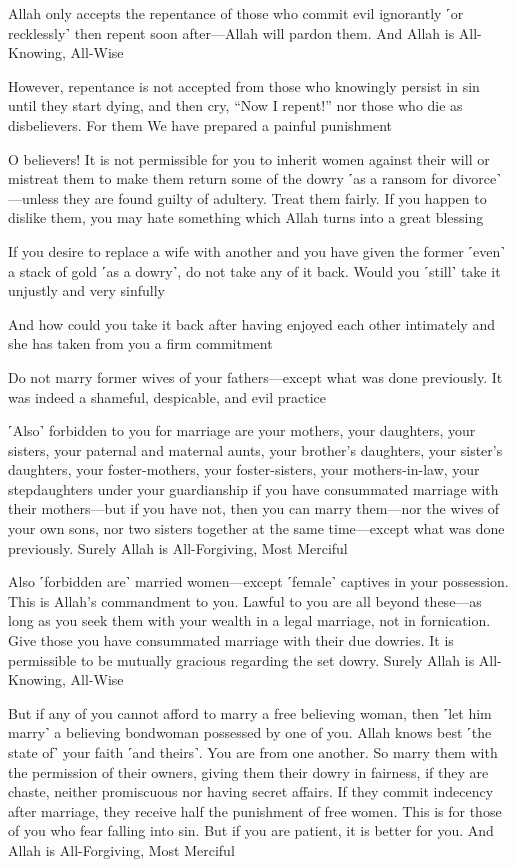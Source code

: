 Allah only accepts the repentance of those who commit evil ignorantly ˹or recklessly˺ then repent soon after—Allah will pardon them. And Allah is All-Knowing, All-Wise

However, repentance is not accepted from those who knowingly persist in sin until they start dying, and then cry, “Now I repent!” nor those who die as disbelievers. For them We have prepared a painful punishment

O believers! It is not permissible for you to inherit women against their will or mistreat them to make them return some of the dowry ˹as a ransom for divorce˺—unless they are found guilty of adultery. Treat them fairly. If you happen to dislike them, you may hate something which Allah turns into a great blessing

If you desire to replace a wife with another and you have given the former ˹even˺ a stack of gold ˹as a dowry˺, do not take any of it back. Would you ˹still˺ take it unjustly and very sinfully

And how could you take it back after having enjoyed each other intimately and she has taken from you a firm commitment

Do not marry former wives of your fathers—except what was done previously. It was indeed a shameful, despicable, and evil practice

˹Also˺ forbidden to you for marriage are your mothers, your daughters, your sisters, your paternal and maternal aunts, your brother’s daughters, your sister’s daughters, your foster-mothers, your foster-sisters, your mothers-in-law, your stepdaughters under your guardianship if you have consummated marriage with their mothers—but if you have not, then you can marry them—nor the wives of your own sons, nor two sisters together at the same time—except what was done previously. Surely Allah is All-Forgiving, Most Merciful

Also ˹forbidden are˺ married women—except ˹female˺ captives in your possession. This is Allah’s commandment to you. Lawful to you are all beyond these—as long as you seek them with your wealth in a legal marriage, not in fornication. Give those you have consummated marriage with their due dowries. It is permissible to be mutually gracious regarding the set dowry. Surely Allah is All-Knowing, All-Wise

But if any of you cannot afford to marry a free believing woman, then ˹let him marry˺ a believing bondwoman possessed by one of you. Allah knows best ˹the state of˺ your faith ˹and theirs˺. You are from one another. So marry them with the permission of their owners, giving them their dowry in fairness, if they are chaste, neither promiscuous nor having secret affairs. If they commit indecency after marriage, they receive half the punishment of free women. This is for those of you who fear falling into sin. But if you are patient, it is better for you. And Allah is All-Forgiving, Most Merciful

